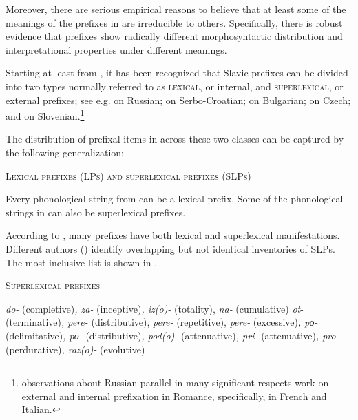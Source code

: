 \documentclass[output=paper,colorlinks,citecolor=brown]{langscibook}
\begin{document}
Moreover, there are serious empirical reasons to believe that at least some of the meanings of the prefixes in  are irreducible to others. Specifically, there is robust evidence that prefixes show radically different morphosyntactic distribution and interpretational properties under different meanings.

Starting at least from \citet{BabkoMalaya1999}, it has been recognized that Slavic prefixes can be divided into two types normally referred to as \textsc{lexical}, or internal, and \textsc{superlexical}, or external prefixes; see e.g. \citet{BabkoMalaya1999,Ramchand2004,Romanova2004,Romanova2007,Svenonius2004,Svenonius2008,DiSciullo.Slabakova2005,Gehrke2008,Tatevosov2008,Tatevosov2009,Tatevosov2013,Zaucer2009,Gribanova2013,Gribanova2015,Tolskaya2015,Biskup2019} on Russian; \citet{Progovac2002, Milicevic2004,Arsenijevic2006,Arsenijevic2007a, Arsenijevic2007b, Arsenijevic2012} on Serbo-Croatian; \citet{Istratkova2004,DiSciullo.Slabakova2005,Slabakova1997,Slabakova2005,Markova2011} on Bulgarian; \citet{Gehrke2008,Biskup2009,Biskup2012,Biskup2015,Biskup2019} on Czech;   and \citet{Zaucer2009,Zaucer2010,Zaucer2012, Zaucer2013} on Slovenian.\footnote{ observations about Russian parallel in many significant respects  work on external and internal prefixation in Romance, specifically, in French and Italian.}

The distribution of prefixal items in  across these two classes can be captured by the following generalization:

\eanoraggedright   \textsc{Lexical prefixes (LPs) and superlexical prefixes (SLPs)}\label{tat:ex:19}

   Every phonological string from  can be a lexical prefix. Some of the phonological strings in  can also be superlexical prefixes.
\z

\noindent According to , many prefixes have both lexical and superlexical manifestations. Different authors (\citealt{BabkoMalaya1999,Svenonius2004,Romanova2007,Gehrke2008,Tolskaya2007,Tolskaya2015,Tatevosov2009,Tatevosov2013,Biskup2019}) identify overlapping but not identical inventories of SLPs. The most inclusive list is shown in .

\ea   \textsc{Superlexical prefixes}\label{tat:ex:20}

  \textit{do-} (completive)\textit{, za-} (inceptive)\textit{, iz(o)-} (totality), \textit{na-} (cumulative) \textit{ot}- (terminative)\textit{, pere-} (distributive), \textit{pere-} (repetitive), \textit{pere-} (excessive)\textit{, p{о}-} (delimitative)\textit{, p{о}-} (distributive)\textit{, pod(o)-} (attenuative)\textit{, pri-} (attenuative)\textit{, pro-} (perdurative)\textit{, raz(o)-} (evolutive)
\z
\end{document}
